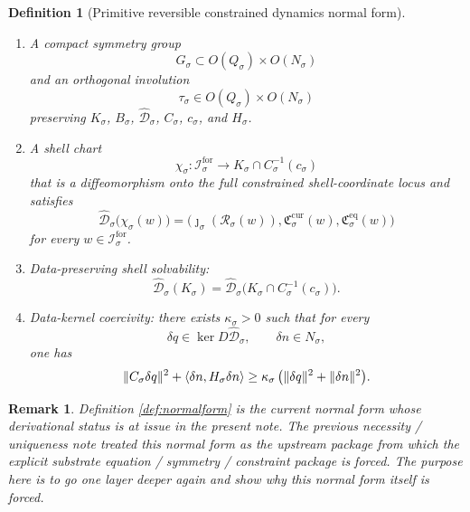 \documentclass[11pt]{article}
\newcommand{\ForSpace}[1]{\mathcal I_{#1}^{\mathrm{for}}}
\newcommand{\Reduction}[1]{\mathcal R_{#1}}
\newcommand{\CurrentCarrier}[1]{\mathfrak C_{#1}^{\mathrm{cur}}}
\newcommand{\EqCarrier}[1]{\mathfrak C_{#1}^{\mathrm{eq}}}
\newcommand{\CoordSpace}[1]{Q_{#1}}
\newcommand{\CoordBody}[1]{K_{#1}}
\newcommand{\NormalSpace}[1]{N_{#1}}
\newcommand{\NormalBody}[1]{B_{#1}}
\newcommand{\AffineData}[1]{\widehat{\mathcal D}_{#1}}
\newcommand{\ConstraintMap}[1]{C_{#1}}
\newcommand{\ConstraintValue}[1]{c_{#1}}
\newcommand{\NormalOperator}[1]{H_{#1}}
\newcommand{\SymGroup}[1]{G_{#1}}
\newcommand{\TimeRev}[1]{\tau_{#1}}
\newcommand{\ShellChart}[1]{\chi_{#1}}
\newtheorem{definition}{Definition}
\newtheorem{remark}{Remark}
\begin{document}
\begin{definition}[Primitive reversible constrained dynamics normal form]
\begin{enumerate}
\begin{equation}
    \ev{\eta,\NormalOperator{\sigma}\eta}\ge \mu_{\sigma}\,\|\eta\|^{2}
    \qquad
    \text{for all }\eta\in\NormalSpace{\sigma}
    \label{eq:normgap}
    \end{equation}
    for some \(\mu_{\sigma}>0\).
    \item A compact symmetry group
    \[
    \SymGroup{\sigma}\subset O(\CoordSpace{\sigma})\times O(\NormalSpace{\sigma})
    \]
    and an orthogonal involution
    \[
    \TimeRev{\sigma}\in O(\CoordSpace{\sigma})\times O(\NormalSpace{\sigma})
    \]
    preserving \(\CoordBody{\sigma}\), \(\NormalBody{\sigma}\), \(\AffineData{\sigma}\), \(\ConstraintMap{\sigma}\), \(\ConstraintValue{\sigma}\), and \(\NormalOperator{\sigma}\).
    \item A shell chart
    \[
    \ShellChart{\sigma}:\ForSpace{\sigma}\to
    \CoordBody{\sigma}\cap \ConstraintMap{\sigma}^{-1}(\ConstraintValue{\sigma})
    \]
    that is a diffeomorphism onto the full constrained shell-coordinate locus and satisfies
    \begin{equation}
    \AffineData{\sigma}\bigl(\ShellChart{\sigma}(w)\bigr)
    =
    \bigl(
    \jmath_{\sigma}(\Reduction{\sigma}(w)),
    \CurrentCarrier{\sigma}(w),
    \EqCarrier{\sigma}(w)
    \bigr)
    \label{eq:shellchartcompat}
    \end{equation}
    for every \(w\in\ForSpace{\sigma}\).
    \item Data-preserving shell solvability:
    \begin{equation}
    \AffineData{\sigma}(\CoordBody{\sigma})
    =
    \AffineData{\sigma}
    \bigl(
    \CoordBody{\sigma}\cap\ConstraintMap{\sigma}^{-1}(\ConstraintValue{\sigma})
    \bigr).
    \label{eq:nfsolvability}
    \end{equation}
    \item Data-kernel coercivity: there exists \(\kappa_{\sigma}>0\) such that for every
    \[
    \delta q\in \ker D\AffineData{\sigma},
    \qquad
    \delta n\in \NormalSpace{\sigma},
    \]
    one has
    \begin{equation}
    \|\ConstraintMap{\sigma}\delta q\|^{2}
    +
    \ev{\delta n,\NormalOperator{\sigma}\delta n}
    \ge
    \kappa_{\sigma}\,
    \bigl(
    \|\delta q\|^{2}+\|\delta n\|^{2}
    \bigr).
    \label{eq:nfcoercive}
    \end{equation}
\end{enumerate}
\end{definition}

\begin{remark}
Definition \ref{def:normalform} is the current normal form whose derivational status is at issue in the present note. The previous necessity / uniqueness note treated this normal form as the upstream package from which the explicit substrate equation / symmetry / constraint package is forced. The purpose here is to go one layer deeper again and show why this normal form itself is forced.
\end{remark}
\end{document}
